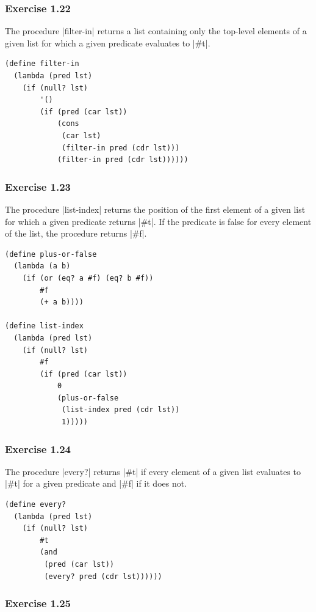 \documentclass[a4paper]{article}
\begin{document}
\subsubsection{Exercise 1.22}

The procedure |filter-in| returns a list containing only the top-level elements of a given list for which a given predicate evaluates to |#t|.

\begin{lstlisting}
(define filter-in
  (lambda (pred lst)
    (if (null? lst)
        '()
        (if (pred (car lst))
            (cons
             (car lst)
             (filter-in pred (cdr lst)))
            (filter-in pred (cdr lst))))))
\end{lstlisting}

\subsubsection{Exercise 1.23}

The procedure |list-index| returns the position of the first element of a given list for which a given predicate returns |#t|. If the predicate is false for every element of the list, the procedure returns |#f|.

\begin{lstlisting}
(define plus-or-false
  (lambda (a b)
    (if (or (eq? a #f) (eq? b #f))
        #f
        (+ a b))))

(define list-index
  (lambda (pred lst)
    (if (null? lst)
        #f
        (if (pred (car lst))
            0
            (plus-or-false
             (list-index pred (cdr lst))
             1)))))
\end{lstlisting}

\subsubsection{Exercise 1.24}

The procedure |every?| returns |#t| if every element of a given list evaluates to |#t| for a given predicate and |#f| if it does not.

\begin{lstlisting}
(define every?
  (lambda (pred lst)
    (if (null? lst)
        #t
        (and
         (pred (car lst))
         (every? pred (cdr lst))))))
\end{lstlisting}

\subsubsection{Exercise 1.25}
\end{document}
